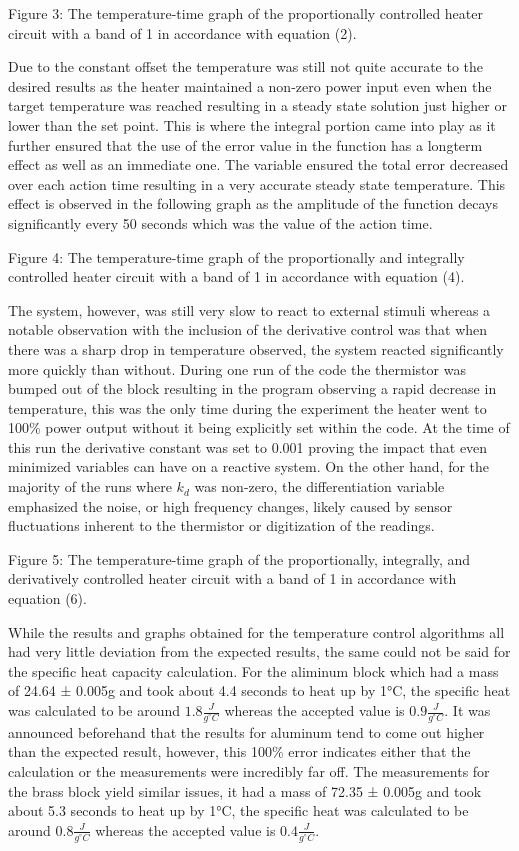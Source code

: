 \documentclass[11pt]{article}
\begin{document}
    Figure 3: The temperature-time graph of the proportionally controlled
heater circuit with a band of 1 in accordance with equation (2).

    Due to the constant offset the temperature was still not quite accurate
to the desired results as the heater maintained a non-zero power input
even when the target temperature was reached resulting in a steady state
solution just higher or lower than the set point. This is where the
integral portion came into play as it further ensured that the use of
the error value in the function has a longterm effect as well as an
immediate one. The variable ensured the total error decreased over each
action time resulting in a very accurate steady state temperature. This
effect is observed in the following graph as the amplitude of the
function decays significantly every 50 seconds which was the value of
the action time.

    Figure 4: The temperature-time graph of the proportionally and
integrally controlled heater circuit with a band of 1 in accordance with
equation (4).

    The system, however, was still very slow to react to external stimuli
whereas a notable observation with the inclusion of the derivative
control was that when there was a sharp drop in temperature observed,
the system reacted significantly more quickly than without. During one
run of the code the thermistor was bumped out of the block resulting in
the program observing a rapid decrease in temperature, this was the only
time during the experiment the heater went to 100\% power output without
it being explicitly set within the code. At the time of this run the
derivative constant was set to 0.001 proving the impact that even
minimized variables can have on a reactive system. On the other hand,
for the majority of the runs where \(k_d\) was non-zero, the
differentiation variable emphasized the noise, or high frequency
changes, likely caused by sensor fluctuations inherent to the thermistor
or digitization of the readings.

    Figure 5: The temperature-time graph of the proportionally, integrally,
and derivatively controlled heater circuit with a band of 1 in
accordance with equation (6).

    While the results and graphs obtained for the temperature control
algorithms all had very little deviation from the expected results, the
same could not be said for the specific heat capacity calculation. For
the aliminum block which had a mass of 24.64 ± 0.005g and took about 4.4
seconds to heat up by 1°C, the specific heat was calculated to be around
\(1.8 \frac{J}{g^{\circ}C}\) whereas the accepted value is
\(0.9 \frac{J}{g^{\circ}C}\). It was announced beforehand that the
results for aluminum tend to come out higher than the expected result,
however, this 100\% error indicates either that the calculation or the
measurements were incredibly far off. The measurements for the brass
block yield similar issues, it had a mass of 72.35 ± 0.005g and took
about 5.3 seconds to heat up by 1°C, the specific heat was calculated to
be around \(0.8 \frac{J}{g^{\circ}C}\) whereas the accepted value is
\(0.4 \frac{J}{g^{\circ}C}\).
\end{document}
